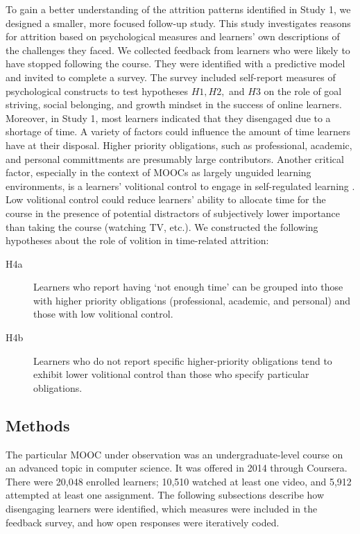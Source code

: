 \documentclass{sigchi}\usepackage[]{graphicx}\usepackage[]{color}
\begin{document}
To gain a better understanding of the attrition patterns identified in Study 1, we designed a smaller, more focused follow-up study. This study investigates reasons for attrition based on psychological measures and learners' own descriptions of the challenges they faced. We collected feedback from learners who were likely to have stopped following the course. They were identified with a predictive model and invited to complete a survey. The survey included self-report measures of psychological constructs to test hypotheses $H1, H2,$ and $H3$ on the role of goal striving, social belonging, and growth mindset in the success of online learners. Moreover, in Study 1, most learners indicated that they disengaged due to a shortage of time. A variety of factors could influence the amount of time learners have at their disposal. Higher priority obligations, such as professional, academic, and personal committments are presumably large contributors. Another critical factor, especially in the context of MOOCs as largely unguided learning environments, is a learners' volitional control to engage in self-regulated learning \cite{corno2001volitional}. Low volitional control could reduce learners' ability to allocate time for the course in the presence of potential distractors of subjectively lower importance than taking the course (watching TV, etc.). We constructed the following hypotheses about the role of volition in time-related attrition:

\begin{description}
  \item[H4a] Learners who report having `not enough time' can be grouped into those with higher priority obligations (professional, academic, and personal) and those with low volitional control.
  \item[H4b] Learners who do not report specific higher-priority obligations tend to exhibit lower volitional control than those who specify particular obligations.
\end{description}  

\subsection{Methods}

The particular MOOC under observation was an undergraduate-level course on an advanced topic in computer science. It was offered in 2014 through Coursera. There were 20,048 enrolled learners; 10,510 watched at least one video, and 5,912 attempted at least one assignment. The following subsections describe how disengaging learners were identified, which measures were included in the feedback survey, and how open responses were iteratively coded.
\end{document}
